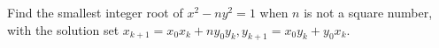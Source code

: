 Find the smallest integer root of $x^2-ny^2=1$ when $n$ is not a square number, with the solution set $x_{k+1} = x_0x_k + ny_0y_k, y_{k+1} = x_0y_k + y_0x_k$.

\inputminted{cpp}{src/mathematics/equality-and-inequality/pell-equation.cpp.com}

